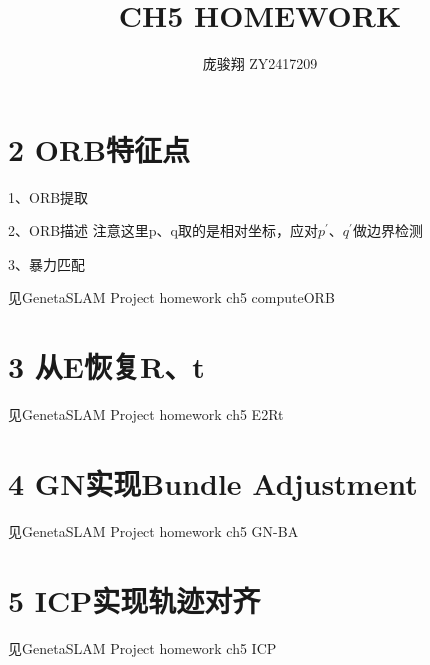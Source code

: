 \documentclass[12pt, a4paper, oneside]{ctexart}
\title{\vspace{-4cm}\bfseries{CH5 HOMEWORK}}
\author{\large 庞骏翔 \quad ZY2417209}  %
\date{}
\begin{document}
	
	\pagestyle{plain}
	\maketitle
	\section{2 ORB特征点}
	
	1、ORB提取
	
	2、ORB描述
	注意这里p、q取的是相对坐标，应对$p^{'}$、$q^{'}$做边界检测
	
	3、暴力匹配
	
	见GenetaSLAM Project homework ch5 computeORB
	
	\section{3 从E恢复R、t}
	
	见GenetaSLAM Project homework ch5 E2Rt
	
	\section{4 GN实现Bundle Adjustment}
	
	见GenetaSLAM Project homework ch5 GN-BA
	
	\section{5 ICP实现轨迹对齐}

	见GenetaSLAM Project homework ch5 ICP
	
\end{document}
